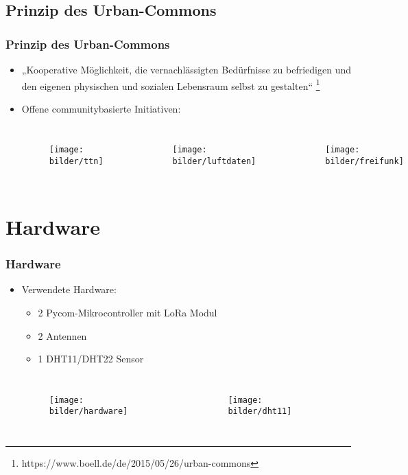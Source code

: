 \documentclass[12pt,utf8]{beamer}
\begin{document}
\subsection{Prinzip des Urban-Commons}
\begin{frame}
\frametitle{Prinzip des Urban-Commons}
\begin{itemize}
\item „Kooperative Möglichkeit, die vernachlässigten Bedürfnisse zu befriedigen und den eigenen physischen und sozialen Lebensraum selbst zu gestalten“ \footnote{https://www.boell.de/de/2015/05/26/urban-commons}
\item Offene communitybasierte Initiativen:
\begin{columns}

\begin{figure}
\texttt{[image: bilder/ttn]}
\end{figure}

\begin{figure}
\texttt{[image: bilder/luftdaten]}
\end{figure}

\begin{figure}
 \texttt{[image: bilder/freifunk]}
\end{figure}
\end{columns}

\end{itemize}
\end{frame}

\section{Hardware}
\begin{frame}
\frametitle{Hardware}
\begin{itemize}
\item Verwendete Hardware:
\begin{itemize}
 \item 2 Pycom-Mikrocontroller mit LoRa Modul
 \item 2 Antennen
 \item 1 DHT11/DHT22 Sensor
\end{itemize}
\begin{columns}
\begin{figure}
\texttt{[image: bilder/hardware]}
\end{figure}
\begin{figure}
 \texttt{[image: bilder/dht11]}
\end{figure}
\end{columns}
\end{itemize}
\end{frame}
\end{document}
